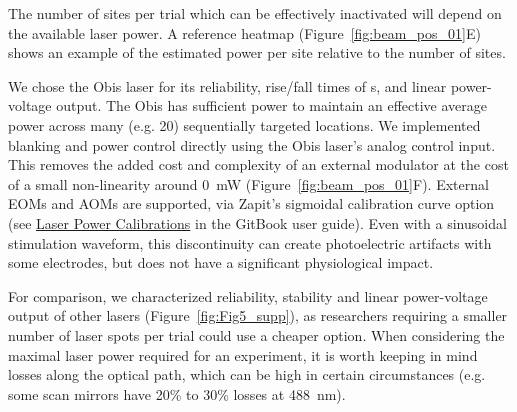 The number of sites per trial which can be effectively inactivated will depend on the available laser power.
A reference heatmap (Figure~\ref{fig:beam_pos_01}E) shows an example of the estimated power per site relative to the number of sites.

We chose the Obis laser for its reliability, rise/fall times of \textmu s, and linear power-voltage output.
The Obis has sufficient power to maintain an effective average power across many (e.g. 20) sequentially targeted locations.
We  implemented blanking and power control directly using the Obis laser's analog control input.
This removes the added cost and complexity of an external modulator at the cost of a small non-linearity around 0~mW (Figure~\ref{fig:beam_pos_01}F).
External EOMs and AOMs are supported, via Zapit's sigmoidal calibration curve option (see \href{https://zapit.swcmicroscopy.com/installation-and-setup/configuring-zapit/laser-power-calibration}{Laser Power Calibrations} in the GitBook user guide).
Even with a sinusoidal stimulation waveform, this discontinuity can create photoelectric artifacts with some electrodes, but does not have a significant physiological impact.

For comparison, we characterized reliability, stability and linear power-voltage output of other lasers (Figure~\ref{fig:Fig5_supp}), as researchers requiring a smaller number of laser spots per trial could use a cheaper option.
When considering the maximal laser power required for an experiment, it is worth keeping in mind losses along the optical path, which can be high in certain circumstances (e.g. some scan mirrors have 20\% to 30\% losses at 488~nm).

